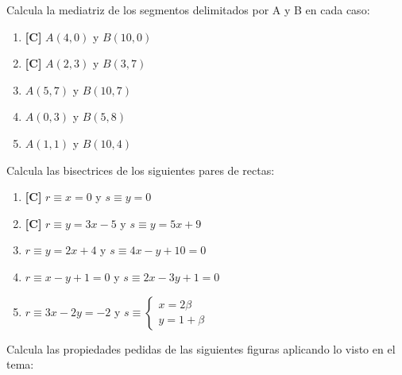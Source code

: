 \Exercicio Calcula la mediatriz de los segmentos delimitados por A y B en cada caso:

\begin{enumerate}[topsep=0pt]
	\item \textbf{[C]} $A(4,0)$ y $B(10,0)$
	\item \textbf{[C]} $A(2,3)$ y $B(3,7)$
	\item $A(5,7)$ y $B(10,7)$
	\item $A(0,3)$ y $B(5,8)$
	\item $A(1,1)$ y $B(10,4)$
\end{enumerate}


\Exercicio Calcula las bisectrices de los siguientes pares de rectas:

\begin{enumerate}[topsep=0pt]
	\item \textbf{[C]} $ r \equiv x=0 $ y $ s \equiv y = 0 $
	\item \textbf{[C]} $ r \equiv y = 3x - 5 $ y $ s \equiv y = 5x + 9 $
	\item $ r \equiv y = 2x + 4 $ y $ s \equiv 4x - y + 10 = 0 $
	\item $ r \equiv x-y + 1 = 0 $ y $ s \equiv 2x - 3y + 1 = 0$
	\item $ r \equiv 3x - 2y = -2 $ y $ s \equiv \left\lbrace \begin{array}{l} x = 2 \beta \\ y = 1 + \beta  \end{array}\right.$
\end{enumerate}


\Exercicio \Exercicio Calcula las propiedades pedidas de las siguientes figuras aplicando lo visto en el tema:

